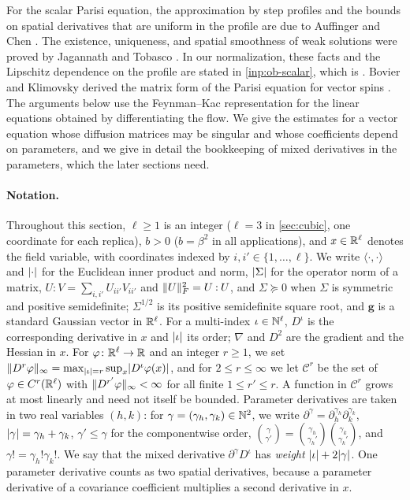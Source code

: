 For the scalar Parisi equation, the approximation by step profiles and the
bounds on spatial derivatives that are uniform in the profile are due to
Auffinger and Chen \cite[Propositions~1--2]{auffinger-chen-2015}. The existence,
uniqueness, and spatial smoothness of weak solutions were proved by Jagannath and
Tobasco \cite[Theorem~1]{jagannath-tobasco-2016}. In our
normalization, these facts and the Lipschitz dependence on the profile are
stated in \cref{inp:ob-scalar}, which is \cite[Lemma~3.1]{oai-barriers}. Bovier
and Klimovsky derived the matrix form of the Parisi equation for vector spins
\cite[Section~6, Proposition~6.1 and (6.5)]{bovier-klimovsky-2009}. The
arguments below use the Feynman--Kac representation for the linear equations
obtained by differentiating the flow. We give the estimates for a vector
equation whose diffusion matrices may be singular and whose coefficients depend
on parameters, and we give in detail the bookkeeping of mixed derivatives in the
parameters, which the later sections need.

\paragraph{Notation.}
Throughout this section, $\ell\ge1$ is an integer ($\ell=3$ in \cref{sec:cubic},
one coordinate for each replica), $b>0$ ($b=\beta^2$ in all applications), and
$x\in\mathbb R^\ell$ denotes the field variable, with coordinates indexed by
$i,i'\in\{1,\dots,\ell\}$. We write $\langle\cdot,\cdot\rangle$ and
$\lvert \cdot\rvert$ for the Euclidean inner product and norm, $\lvert \Sigma\rvert$ for the
operator norm of a matrix, $U\mathbin{:}V=\sum_{i,i'}U_{ii'}V_{ii'}$ and
$\lVert U\rVert_F^2=U\mathbin{:}U$, and $\Sigma\succeq0$ when $\Sigma$ is symmetric
and positive semidefinite; $\Sigma^{1/2}$ is its positive semidefinite square
root, and $\mathbf g$ is a standard Gaussian vector in $\mathbb R^\ell$. For a multi-index
$\iota\in\mathbb N^\ell$, $D^\iota$ is the corresponding derivative in $x$ and
$\lvert \iota\rvert$ its order; $\nabla$ and $D^2$ are the gradient and the Hessian in
$x$. For $\varphi\colon\mathbb R^\ell\to\mathbb R$ and an integer $r\ge1$, we set
$\lVert D^r\varphi\rVert_\infty=\max_{\lvert \iota\rvert=r}\sup_x\lvert D^\iota\varphi(x)\rvert$, and
for $2\le r\le\infty$ we let $\mathcal C^r$ be the set of
$\varphi\in C^r(\mathbb R^\ell)$ with $\lVert D^{r'}\varphi\rVert_\infty<\infty$ for all finite
$1\le r'\le r$. A function in $\mathcal C^r$ grows at most linearly and need
not itself be bounded. Parameter derivatives are taken in two real variables
$(h,k)$: for $\gamma=(\gamma_h,\gamma_k)\in\mathbb N^2$, we write
$\partial^\gamma=\partial_h^{\gamma_h}\partial_k^{\gamma_k}$,
$\lvert \gamma\rvert=\gamma_h+\gamma_k$, $\gamma'\le\gamma$ for the componentwise order,
$\binom{\gamma}{\gamma'}=\binom{\gamma_h}{\gamma_h'}\binom{\gamma_k}{\gamma_k'}$,
and $\gamma!=\gamma_h!\gamma_k!$. We say that the mixed derivative
$\partial^\gamma D^\iota$ has \emph{weight} $\lvert \iota\rvert+2\lvert \gamma\rvert$. One parameter
derivative counts as two spatial derivatives, because a parameter derivative of
a covariance coefficient multiplies a second derivative in $x$.

